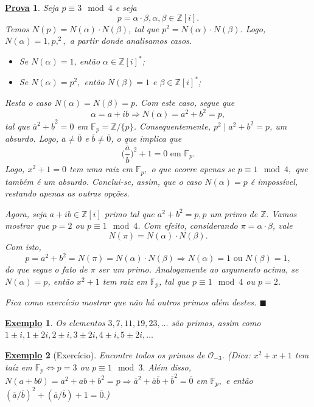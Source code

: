 \documentclass{article}
\newtheorem{example}{\underline{Exemplo}}
\newtheorem*{proof*}{\underline{Prova}}
\renewcommand\qedsymbol{$\blacksquare$}
\begin{document}
\begin{proof*}
  Seja \(p\equiv 3\mod 4\) e seja 
  \[
    p = \alpha \cdot \beta , \alpha , \beta \in \mathbb{Z}[i].
  \]
  Temos \(N(p) = N(\alpha )\cdot N(\beta )\), tal que \(p^{2} = N(\alpha )\cdot N(\beta )\). Logo,
  \(N(\alpha ) = 1, p, ^{2},\) a partir donde analisamos casos.
  \begin{itemize}
    \item Se \(N(\alpha ) = 1\), então \(\alpha \in \mathbb{Z}[i]^{*}\);
    \item Se \(N(\alpha ) = p^{2},\) então \(N(\beta ) = 1\) e \(\beta \in \mathbb{Z}[i]^{*}\);
  \end{itemize}
  Resta o caso \(N(\alpha ) = N(\beta ) = p.\) Com este caso, segue que 
  \[
    \alpha = a + ib \Rightarrow N(\alpha ) = a^{2} + b^{2} = p,
  \]
  tal que \(\overline{a}^{2} + \overline{b}^{2} = 0\) em \(\mathbb{F}_{p} = \mathbb{Z}/\{p\}\). Consequentemente,
  \(p^{2}\mid a^{2}+b^{2} = p\), um absurdo. Logo, \(\overline{a}\neq \overline{0}\) e \(\overline{b}\neq \overline{0}\), o que implica que 
  \[
    \biggl(\frac{\overline{a}}{\overline{b}}\biggr)^{2} + 1 = 0 \text{ em } \mathbb{F}_{p}.
  \]
  Logo, \(x^{2} + 1 = 0\) tem uma raiz em \(\mathbb{F}_{p},\) o que ocorre apenas se \(p\equiv 1 \mod 4,\) que também
  é um absurdo. Conclui-se, assim, que o caso \(N(\alpha ) = p\) é impossível, restando apenas as outras opções.

  Agora, seja \(a+ib\in \mathbb{Z}[i]\) primo tal que \(a^{2} + b^{2} = p, p\) um primo de \(\mathbb{Z}.\)
  Vamos mostrar que \(p = 2\) ou \(p\equiv 1\mod 4\). Com efeito, considerando \(\pi  = \alpha \cdot \beta \), vale 
  \[
    N(\pi ) = N(\alpha )\cdot N(\beta ).
  \]
  Com isto, 
  \[
    p = a^{2} + b^{2} = N(\pi) = N(\alpha )\cdot N(\beta ) \Rightarrow N(\alpha ) = 1 \text{ ou } N(\beta ) = 1,
  \]
  do que segue o fato de \(\pi \) ser um primo. Analogamente ao argumento acima, se \(N(\alpha ) = p\), então \(x^{2} + 1\) tem raiz em \(\mathbb{F}_{p}\),
  tal que \(p\equiv 1 \mod 4\) ou \(p = 2\).

  Fica como exercício mostrar que não há outros primos além destes. \qedsymbol
\end{proof*}
\begin{example}
  Os elementos \(3, 7, 11, 19, 23, \dotsc\) são primos, assim como \(1\pm i, 1\pm 2i, 2\pm i, 3\pm 2i, 4\pm i, 5\pm 2i, \dotsc\) 
\end{example}
\begin{example}[Exercício]
   Encontre todos os primos de \(\mathcal{O}_{-3}\). (Dica: \(x^{2}+x+1\) tem taíz em
 \(\mathbb{F}_{p} \Longleftrightarrow p = 3\) ou \(p\equiv 1\mod 3.\) Além disso, \(N(a + b\theta ) 
 = a^{2} + ab + b^{2} = p \Rightarrow \overline{a}^{2} + \overline{a}\overline{b} + \overline{b}^{2} = \overline{0}\)
 em \(\mathbb{F}_{p},\) e então \((\overline{a}/\overline{b})^{2} + (\overline{a}/\overline{b}) + 1 = \overline{0}.\))
 \end{example}
\newpage
\end{document}
